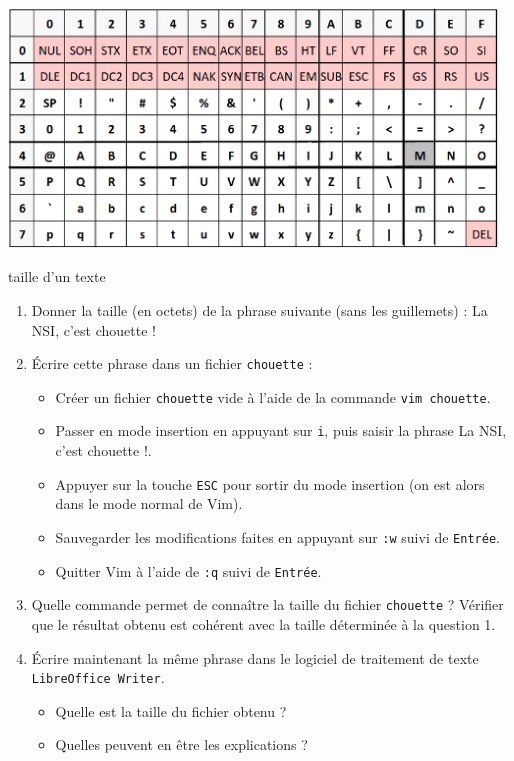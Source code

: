 \documentclass[a4paper,dvipsnames]{article}
\begin{document}
\begin{center}
  \includegraphics[width=13cm]{img/ascii-table-hexa-encoding.png}
\end{center}

\medskip

\begin{activite}[breakable]{taille d'un texte}{}
  \begin{enumerate}
    \item Donner la taille (en octets) de la phrase suivante (sans les guillemets) : \og{}La NSI, c'est chouette !\fg{}
    \item Écrire cette phrase dans un fichier \verb|chouette| :
      \begin{itemize}
        \item Créer un fichier \verb|chouette| vide à l'aide de la commande \verb|vim chouette|.
	\item Passer en mode insertion en appuyant sur \verb|i|, puis saisir la phrase \og{}La NSI, c'est chouette !\fg{}.
	\item Appuyer sur la touche \verb|ESC| pour sortir du mode insertion (on est alors dans le mode normal de Vim).
	\item Sauvegarder les modifications faites en appuyant sur \verb|:w| suivi de \verb|Entrée|.
	\item Quitter Vim à l'aide de \verb|:q| suivi de \verb|Entrée|.
      \end{itemize}
    \item Quelle commande permet de connaître la taille du fichier \verb|chouette| ? Vérifier que le résultat obtenu est cohérent avec la taille déterminée à la question 1.
    \item  Écrire maintenant la même phrase dans le logiciel de traitement de texte \verb|LibreOffice Writer|.
      \begin{itemize}
        \item Quelle est la taille du fichier obtenu ?
	\item Quelles peuvent en être les explications ?
      \end{itemize}
  \end{enumerate}
\end{activite}
\end{document}
